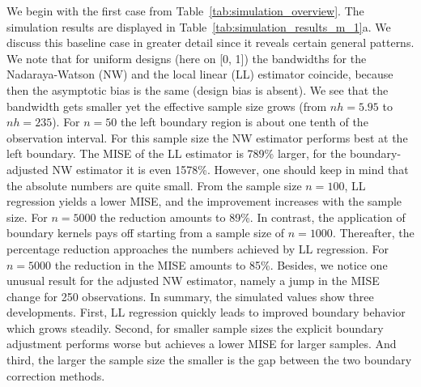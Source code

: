 We begin with the first case from Table~\ref{tab:simulation_overview}.
The simulation results are displayed in Table~\ref{tab:simulation_results_m_1}a.
We discuss this baseline case in greater detail since it reveals certain general patterns.
We note that for uniform designs (here on [0, 1]) the bandwidths for the Nadaraya-Watson (NW) and the local linear (LL) estimator coincide,
because then the asymptotic bias is the same (design bias is absent).
We see that the bandwidth gets smaller yet the effective sample size grows (from $nh = 5.95$ to $nh = 235$).
For $n = 50$ the left boundary region is about one tenth of the observation interval.
For this sample size the NW estimator performs best at the left boundary.
The MISE of the LL estimator is 789\% larger, for the boundary-adjusted NW estimator it is even 1578\%.
However, one should keep in mind that the absolute numbers are quite small.
From the sample size $n = 100$, LL regression yields a lower MISE, and the improvement increases with the sample size.
For $n = 5000$ the reduction amounts to 89\%.
In contrast, the application of boundary kernels pays off starting from a sample size of $n = 1000$.
Thereafter, the percentage reduction approaches the numbers achieved by LL regression.
For $n = 5000$ the reduction in the MISE amounts to 85\%.
Besides, we notice one unusual result for the adjusted NW estimator, namely a jump in the MISE change for 250 observations.
In summary, the simulated values show three developments.
First, LL regression quickly leads to improved boundary behavior which grows steadily.
Second, for smaller sample sizes the explicit boundary adjustment performs worse but achieves a lower MISE for larger samples.
And third, the larger the sample size the smaller is the gap between the two boundary correction methods.    

